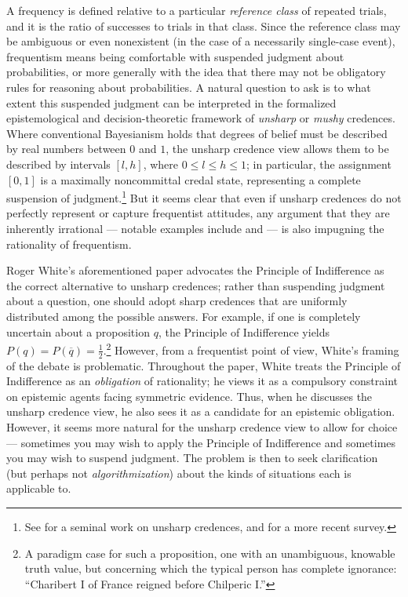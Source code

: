 \documentclass[letterpaper,12pt]{article}
\begin{document}
A frequency is defined relative to a particular \emph{reference class} of repeated trials, and it is the ratio of successes to trials in that class. Since the reference class may be ambiguous or even nonexistent (in the case of a necessarily single-case event), frequentism means being comfortable with suspended judgment about probabilities, or more generally with the idea that there may not be obligatory rules for reasoning about probabilities. A natural question to ask is to what extent this suspended judgment can be interpreted in the formalized epistemological and decision-theoretic framework of \emph{unsharp} or \emph{mushy} credences. Where conventional Bayesianism holds that degrees of belief must be described by real numbers between $0$ and $1$, the unsharp credence view allows them to be described by intervals $[l, h]$, where $0 \leq l \leq h \leq 1$; in particular, the assignment $[0, 1]$ is a maximally noncommittal credal state, representing a complete suspension of judgment.\footnote{See \cite{Gardenfors1982-GRDUPR} for a seminal work on unsharp credences, and \cite{Joyce2010-JOYADO-2} for a more recent survey.} But it seems clear that even if unsharp credences do not perfectly represent or capture frequentist attitudes, any argument that they are inherently irrational --- notable examples include \cite{elga2010subjective} and \cite{White2009-WHIESA} --- is also impugning the rationality of frequentism.

Roger White's aforementioned paper advocates the Principle of Indifference as the correct alternative to unsharp credences; rather than suspending judgment about a question, one should adopt sharp credences that are uniformly distributed among the possible answers. For example, if one is completely uncertain about a proposition $q$, the Principle of Indifference yields $P(q) = P(\overline{q}) = \frac{1}{2}$.\footnote{A paradigm case for such a proposition, one with an unambiguous, knowable truth value, but concerning which the typical person has complete ignorance: ``Charibert I of France reigned before Chilperic I.''} However, from a frequentist point of view, White's framing of the debate is problematic. Throughout the paper, White treats the Principle of Indifference as an \emph{obligation} of rationality; he views it as a compulsory constraint on epistemic agents facing symmetric evidence. Thus, when he discusses the unsharp credence view, he also sees it as a candidate for an epistemic obligation. However, it seems more natural for the unsharp credence view to allow for choice --- sometimes you may wish to apply the Principle of Indifference and sometimes you may wish to suspend judgment. The problem is then to seek clarification (but perhaps not \emph{algorithmization}) about the kinds of situations each is applicable to.
\end{document}
